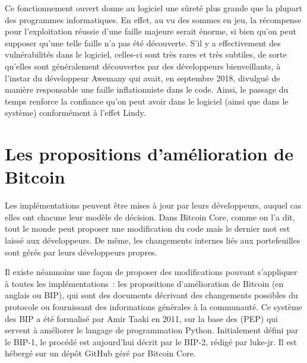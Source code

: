 Ce fonctionnement ouvert donne au logiciel une sûreté plus grande que la plupart des programmes informatiques. En effet, au vu des sommes en jeu, la récompense pour l'exploitation réussie d'une faille majeure serait énorme, si bien qu'on peut supposer qu'une telle faille n'a pas été découverte. S'il y a effectivement des vulnérabilités dans le logiciel, celles-ci sont très rares et très subtiles, de sorte qu'elles sont généralement découvertes par des développeurs bienveillants, à l'instar du développeur Awemany qui avait, en septembre 2018, divulgué de manière responsable une faille inflationniste dans le code. Ainsi, le passage du temps renforce la confiance qu'on peut avoir dans le logiciel (ainsi que dans le système) conformément à l'effet Lindy. %

\section*{Les propositions d'amélioration de Bitcoin}

Les implémentations peuvent être mises à jour par leurs développeurs, auquel cas elles ont chacune leur modèle de décision. Dans Bitcoin Core, comme on l'a dit, tout le monde peut proposer une modification du code mais le dernier mot est laissé aux développeurs. De même, les changements internes liés aux portefeuilles sont gérés par leurs développeurs propres.

Il existe néanmoins une façon de proposer des modifications pouvant s'appliquer à toutes les implémentations~: les propositions d'amélioration de Bitcoin (en anglais  ou BIP), qui sont des documents décrivant des changements possibles du protocole ou fournissant des informations générales à la communauté. Ce système des BIP a été formalisé par Amir Taaki en 2011, sur la base des  (PEP) qui servent à améliorer le langage de programmation Python. Initialement défini par le BIP-1, le procédé est aujourd'hui décrit par le BIP-2, rédigé par luke-jr. Il est hébergé sur un dépôt GitHub géré par Bitcoin Core.

